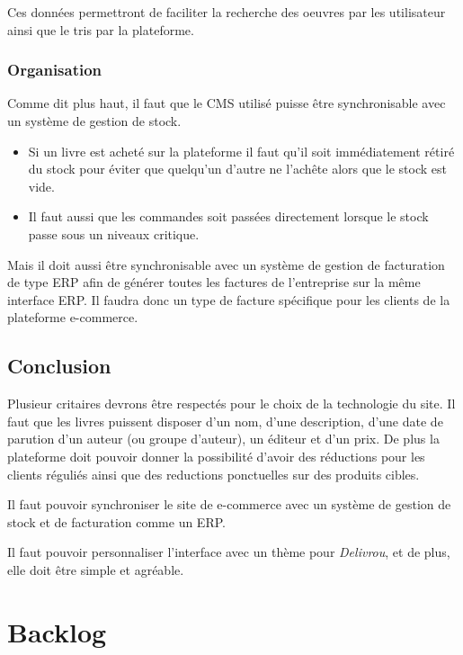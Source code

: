 \documentclass[a4paper,12pt]{report}
\begin{document}
Ces données permettront de faciliter la recherche des oeuvres par les utilisateur
ainsi que le tris par la plateforme.

\section{Organisation}
Comme dit plus haut, il faut que le CMS utilisé puisse être synchronisable avec
un système de gestion de stock.

\begin{itemize}
\item Si un livre est acheté sur la plateforme il faut qu'il soit immédiatement
  rétiré du stock pour éviter que quelqu'un d'autre ne l'achête alors que le
  stock est vide.
\item Il faut aussi que les commandes soit passées directement lorsque le stock
  passe sous un niveaux critique.
\end{itemize}
Mais il doit aussi être synchronisable avec un système de gestion de
facturation de type ERP afin de générer toutes les factures de l'entreprise sur
la même interface ERP. Il faudra donc un type de facture spécifique pour les
clients de la plateforme e-commerce.

\chapter{Conclusion}
Plusieur critaires devrons être respectés pour le choix de la technologie du
site.
Il faut que les livres puissent disposer d'un nom, d'une description, d'une
date de parution d'un auteur (ou groupe d'auteur), un éditeur et d'un prix.
De plus la plateforme doit pouvoir donner la possibilité d'avoir des
réductions pour les clients réguliés ainsi que des reductions ponctuelles sur
des produits cibles.

Il faut pouvoir synchroniser le site de e-commerce avec un système de gestion
de stock et de facturation comme un ERP.

Il faut pouvoir personnaliser l'interface avec un thème pour
\textit{Delivrou}, et de plus, elle doit être simple et agréable.

\part{Backlog}
\end{document}

